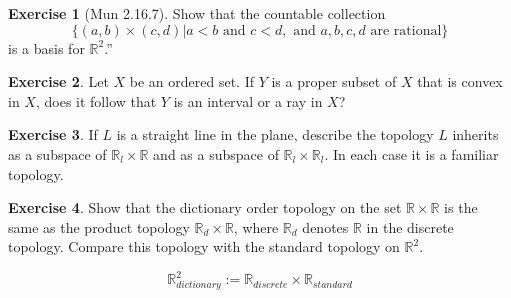 \documentclass[
]{book}
\theoremstyle{definition}
\theoremstyle{definition}
\theoremstyle{definition}
\newtheorem{exercise}{Exercise}[chapter]
\theoremstyle{definition}
\theoremstyle{remark}
\begin{document}
\begin{exercise}[Mun 2.16.7]
\protect\hypertarget{exr:unnamed-chunk-99}{}\label{exr:unnamed-chunk-99}Show that the countable collection
\[\{(a, b) \times (c, d) | a < b \text{ and } c < d, \text{ and } a, b, c, d \text{ are rational}\}\]
is a basis for \(\mathbb{R}^2\).''
\end{exercise}

\begin{exercise}
\protect\hypertarget{exr:unnamed-chunk-100}{}\label{exr:unnamed-chunk-100}Let \(X\) be an ordered set. If \(Y\) is a proper subset of \(X\) that is convex in \(X\), does it follow that \(Y\) is an interval or a ray in \(X\)?
\end{exercise}

\begin{exercise}
\protect\hypertarget{exr:unnamed-chunk-101}{}\label{exr:unnamed-chunk-101}If \(L\) is a straight line in the plane, describe the topology \(L\) inherits as a subspace of \(\mathbb{R}_l \times \mathbb{R}\) and as a subspace of \(\mathbb{R}_l \times \mathbb{R}_l\). In each case it is a familiar topology.
\end{exercise}

\begin{exercise}
\protect\hypertarget{exr:unnamed-chunk-102}{}\label{exr:unnamed-chunk-102}Show that the dictionary order topology on the set \(\mathbb{R} \times \mathbb{R}\) is the same as the product topology \(\mathbb{R}_d \times \mathbb{R}\), where \(\mathbb{R}_d\) denotes \(\mathbb{R}\) in the discrete topology. Compare this topology with the standard topology on \(\mathbb{R}^2\).
\end{exercise}

\[\mathbb{R}^2_{dictionary}:=\mathbb{R}_{discrete }\times \mathbb{R}_{standard}\]
\end{document}
